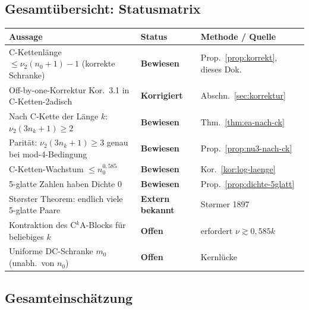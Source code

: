 \documentclass[12pt,a4paper]{article}
\newcommand{\vii}{\nu_2}
\begin{document}
	\subsection{Gesamtübersicht: Statusmatrix}
	
	\begin{center}
		\renewcommand{\arraystretch}{1.5}
		\begin{tabular}{p{7.5cm} p{2.5cm} p{3.5cm}}
			\toprule
			\textbf{Aussage} & \textbf{Status} & \textbf{Methode / Quelle} \\
			\midrule
			C-Kettenlänge $\leq \vii(n_0+1)-1$ (korrekte Schranke)
			& \textcolor{bewiesengrün}{\bfseries Bewiesen} & Prop.~\ref{prop:korrekt}, dieses Dok. \\
			Off-by-one-Korrektur Kor.~3.1 in C-Ketten-2adisch
			& \textcolor{bewiesengrün}{\bfseries Korrigiert} & Abschn.~\ref{sec:korrektur} \\
			Nach C-Kette der Länge $k$: $\vii(3n_k+1)\geq 2$
			& \textcolor{bewiesengrün}{\bfseries Bewiesen} & Thm.~\ref{thm:ea-nach-ck} \\
			Parität: $\vii(3n_k+1)\geq 3$ genau bei mod-4-Bedingung
			& \textcolor{bewiesengrün}{\bfseries Bewiesen} & Prop.~\ref{prop:nu3-nach-ck} \\
			C-Ketten-Wachstum $\leq n_0^{0{,}585}$
			& \textcolor{bewiesengrün}{\bfseries Bewiesen} & Kor.~\ref{kor:log-laenge} \\
			5-glatte Zahlen haben Dichte $0$
			& \textcolor{bewiesengrün}{\bfseries Bewiesen} & Prop.~\ref{prop:dichte-5glatt} \\
			Størster Theorem: endlich viele 5-glatte Paare
			& \textcolor{bewiesengrün}{\bfseries Extern bekannt} & Størmer 1897 \\
			Kontraktion des C$^k$A-Blocks für beliebiges $k$
			& \textcolor{lückenrot}{\bfseries Offen} & erfordert $\nu \gtrsim 0{,}585k$ \\
			Uniforme DC-Schranke $m_0$ (unabh.\ von $n_0$)
			& \textcolor{lückenrot}{\bfseries Offen} & Kernlücke \\
			\bottomrule
		\end{tabular}
	\end{center}
	
	\subsection{Gesamteinschätzung}
	
\end{document}
